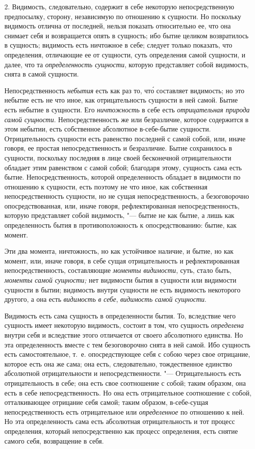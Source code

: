 2. Видимость, следовательно, содержит в себе некоторую непосредственную
предпосылку, сторону, независимую по отношению к сущности. Но поскольку
видимость отлична от последней, нельзя показать относительно ее, что она
снимает себя и возвращается опять в сущность; ибо бытие целиком
возвратилось в сущность; видимость есть ничтожное в себе; следует только
показать, что определения, отличающие ее от сущности, суть определения
самой сущности, и далее, что та {\em определенность
сущности}, которую представляет собой видимость, снята в самой сущности.

Непосредственность {\em небытия} есть как раз то, чт\'{о}
составляет видимость; но это небытие есть не что иное, как отрицательность
сущности в ней самой. Бытие есть небытие в сущности. Его
{\em ничтожность} в себе есть
{\em отрицательная природа самой сущности}.
Непосредственность же или безразличие, которое содержится в этом небытии,
есть собственное абсолютное в-себе-бытие сущности. Отрицательность сущности
есть равенство последней с самой собой, или, иначе говоря, ее простая
непосредственность и безразличие. Бытие сохранилось в сущности, поскольку
последняя в лице своей бесконечной отрицательности обладает этим равенством
с самой собой; благодаря этому, сущность сама есть бытие.
Непосредственность, которой определенность обладает в видимости по
отношению к сущности, есть поэтому не что иное, как собственная
непосредственность сущности, но не сущая непосредственность, а
безоговорочно опосредствованная, или, иначе говоря, рефлектированная
непосредственность, которую представляет собой видимость, "--- бытие не как
бытие, а лишь как определенность бытия в противоположность к
опосредствованию: бытие, как момент.

Эти два момента, ничтожность, но как устойчивое наличие, и бытие, но как
момент, или, иначе говоря, в себе сущая отрицательность и рефлектированная
непосредственность, составляющие {\em моменты
видимости}, суть, стало быть, {\em моменты самой
сущности;} нет видимости бытия в сущности или видимости сущности в бытии;
видимость внутри сущности не есть видимость некоторого другого, а она есть
{\em видимость в себе},
{\em видимость самой сущности}.

Видимость есть сама сущность в определенности бытия. То, вследствие чего
сущность имеет некоторую видимость, состоит в том, что сущность
{\em определена} внутри себя и вследствие этого
отличается от своего абсолютного единства. Но эта определенность вместе с
тем безоговорочно снята в ней самой. Ибо сущность есть самостоятельное,
т.~е. опосредствующее себя с собою через свое отрицание, которое есть она
же сама; она есть, следовательно, тождественное единство абсолютной
отрицательности и непосредственности. "--- Отрицательность есть
отрицательность в себе; она есть свое соотношение с собой; таким образом,
она есть в себе непосредственность. Но она есть отрицательное соотношение с
собой, отталкивающее отрицание себя самой; таким образом, в-себе-сущая
непосредственность есть отрицательное или
{\em определенное} по отношению к ней. Но эта
определенность сама есть абсолютная отрицательность и тот процесс
определения, который непосредственно как процесс определения, есть снятие
самого себя, возвращение в себя.

